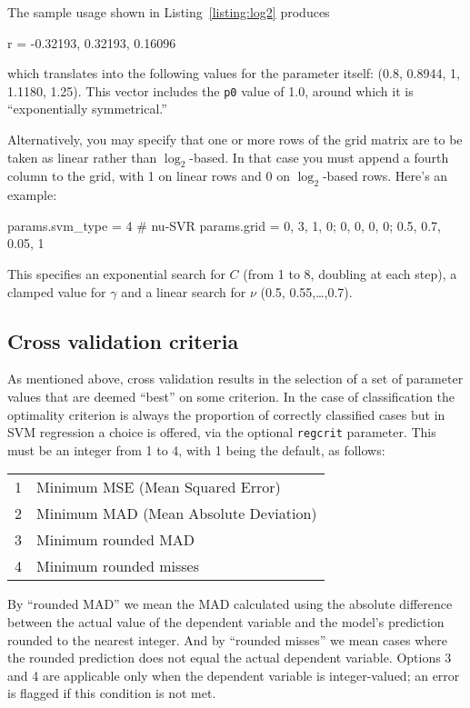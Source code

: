 \documentclass{article}
\begin{document}
The sample usage shown in Listing~\ref{listing:log2} produces
\begin{code}
r = {-0.32193, 0.32193, 0.16096}
\end{code}
which translates into the following values for the parameter itself:
(0.8, 0.8944, 1, 1.1180, 1.25). This vector includes the \texttt{p0}
value of 1.0, around which it is ``exponentially symmetrical.''

Alternatively, you may specify that one or more rows of the grid
matrix are to be taken as linear rather than $\log_2$-based. In that
case you must append a fourth column to the grid, with 1 on linear
rows and 0 on $\log_2$-based rows. Here's an example:
\begin{code}
params.svm_type = 4 # nu-SVR
params.grid = {0, 3, 1, 0; 0, 0, 0, 0; 0.5, 0.7, 0.05, 1}
\end{code}
This specifies an exponential search for $C$ (from 1 to 8, doubling at
each step), a clamped value for $\gamma$ and a linear search for
$\nu$ (0.5, 0.55,\dots,0.7).

\subsection{Cross validation criteria}
\label{sec:regcrit}

As mentioned above, cross validation results in the selection of a set
of parameter values that are deemed ``best'' on some criterion. In the
case of classification the optimality criterion is always the
proportion of correctly classified cases but in SVM regression a
choice is offered, via the optional \texttt{regcrit} parameter. This
must be an integer from 1 to 4, with 1 being the default, as follows:
%
\begin{center}
  \begin{tabular}{ll}
    1 & Minimum MSE (Mean Squared Error) \\
    2 & Minimum MAD (Mean Absolute Deviation) \\
    3 & Minimum rounded MAD \\
    4 & Minimum rounded misses\\
  \end{tabular}
\end{center}
%
By ``rounded MAD'' we mean the MAD calculated using the absolute
difference between the actual value of the dependent variable and the
model's prediction rounded to the nearest integer. And by ``rounded
misses'' we mean cases where the rounded prediction does not equal the
actual dependent variable. Options 3 and 4 are applicable only when
the dependent variable is integer-valued; an error is flagged if this
condition is not met.
\end{document}
